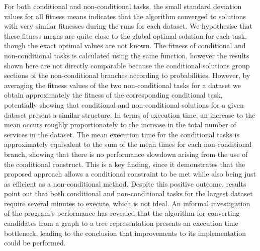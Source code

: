 \documentclass[conference]{IEEEtran}
\begin{document}
For both conditional and non-conditional tasks, the small standard deviation values for all fitness means indicates that the algorithm converged to solutions with very similar fitnesses during the runs for each dataset. We hypothesise that these fitness means are quite close to the global optimal solution for each task, though the exact optimal values are not known. The fitness  of conditional and non-conditional tasks is calculated using the same function, however the results shown here are not directly comparable because the conditional solutions group sections of the non-conditional branches according to probabilities. However, by averaging the fitness values of the two non-conditional tasks for a dataset we obtain approximately the fitness of the corresponding conditional task, potentially showing that conditional and non-conditional solutions for a given dataset present a similar structure. In terms of execution time, an increase to the mean occurs roughly proportionately to the increase in the total number of services in the dataset. The mean execution time for the conditional tasks is approximately equivalent to the sum of the mean times for each non-conditional branch, showing that there is no performance slowdown arising from the use of the conditional construct. This is a key finding, since it demonstrates that the proposed approach allows a conditional constraint to be met while also being just as efficient as a non-conditional method. Despite this positive outcome, results point out that both conditional and non-conditional tasks for the largest dataset require several minutes to execute, which is not ideal. An informal investigation of the program's performance has revealed that the algorithm for converting candidates from a graph to a tree representation presents an execution time bottleneck, leading to the conclusion that improvements to its implementation could be performed.
\end{document}
